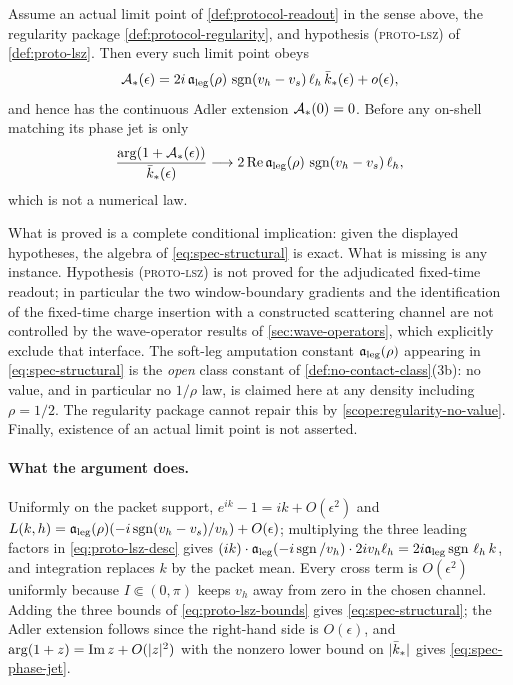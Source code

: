 \begin{theorem}
\label{thm:soft-index-structural}
\statusSketch

Assume an actual limit point of \cref{def:protocol-readout} in the sense
above, the regularity package \cref{def:protocol-regularity}, and hypothesis
\textsc{(proto-lsz)} of \cref{def:proto-lsz}. Then every such limit point
obeys
\begin{equation}
  \mathcal{A}_*(\epsilon)=
  2i\,\mathfrak{a}_{\mathrm{leg}}(\rho)\,\operatorname{sgn}(v_h-v_s)\,\ell_h\,\bar k_*(\epsilon)+o(\epsilon),
  \label{eq:spec-structural}
\end{equation}
and hence has the continuous Adler extension $\mathcal{A}_*(0)=0$. Before any
on-shell matching its phase jet is only
\begin{equation}
  \frac{\arg(1+\mathcal{A}_*(\epsilon))}{\bar k_*(\epsilon)}
  \longrightarrow
  2\,\mathrm{Re}\,\mathfrak{a}_{\mathrm{leg}}(\rho)\,\operatorname{sgn}(v_h-v_s)\,\ell_h ,
  \label{eq:spec-phase-jet}
\end{equation}
which is not a numerical law.
\end{theorem}

\begin{scope}
\label{scope:soft-index-structural}
What is proved is a complete conditional implication: given the displayed
hypotheses, the algebra of \cref{eq:spec-structural} is exact. What is missing
is any instance. Hypothesis \textsc{(proto-lsz)} is not proved for the
adjudicated fixed-time readout; in particular the two window-boundary
gradients and the identification of the fixed-time charge insertion with a
constructed scattering channel are not controlled by the wave-operator results
of \cref{sec:wave-operators}, which explicitly exclude that interface. The
soft-leg amputation constant $\mathfrak{a}_{\mathrm{leg}}(\rho)$ appearing in
\cref{eq:spec-structural} is the \emph{open} class constant of
\cref{def:no-contact-class}(3b): no value, and in particular no $1/\rho$ law,
is claimed here at any density including $\rho=1/2$. The regularity package
cannot repair this by \cref{scope:regularity-no-value}. Finally, existence of
an actual limit point is not asserted.
\end{scope}

\paragraph{What the argument does.} Uniformly on the packet support,
$e^{ik}-1=ik+O(\epsilon^2)$ and
$L(k,h)=\mathfrak{a}_{\mathrm{leg}}(\rho)(-i\operatorname{sgn}(v_h-v_s)/v_h)+O(\epsilon)$; multiplying the three
leading factors in \cref{eq:proto-lsz-desc} gives
$(ik)\cdot\mathfrak{a}_{\mathrm{leg}}(-i\operatorname{sgn}/v_h)\cdot 2iv_h\ell_h
=2i\mathfrak{a}_{\mathrm{leg}}\operatorname{sgn}\,\ell_h\,k$, and integration replaces $k$ by the packet mean.
Every cross term is $O(\epsilon^2)$ uniformly because $I\Subset(0,\pi)$ keeps
$v_h$ away from zero in the chosen channel. Adding the three bounds of
\cref{eq:proto-lsz-bounds} gives \cref{eq:spec-structural}; the Adler
extension follows since the right-hand side is $O(\epsilon)$, and
$\arg(1+z)=\mathrm{Im}\,z+O(\lvert z\rvert^2)$ with the nonzero lower bound on
$\lvert \bar k_*\rvert$ gives \cref{eq:spec-phase-jet}.

